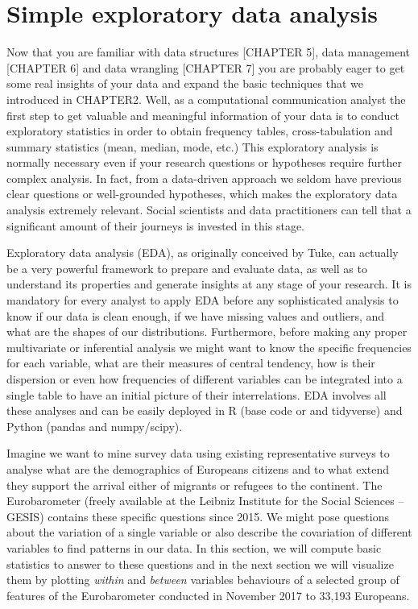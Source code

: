 \section{Simple exploratory data analysis}

Now that you are familiar with data structures [CHAPTER 5], data management [CHAPTER 6] and data wrangling [CHAPTER 7] you are probably eager to get some real insights of your data and expand the basic techniques that we introduced in CHAPTER2. Well, as a computational communication analyst the first step to get valuable and meaningful information of your data is to conduct exploratory statistics in order to obtain frequency tables, cross-tabulation and summary statistics (mean, median, mode, etc.)  This exploratory analysis is normally necessary even if your research questions or hypotheses require further complex analysis. In fact, from a data-driven approach we seldom have previous clear questions or well-grounded hypotheses, which makes the exploratory data analysis extremely relevant. Social scientists and data practitioners can tell that a significant amount of their journeys is invested in this stage.

Exploratory data analysis (EDA), as originally conceived by Tuke\cite{tukey1977exploratory}, can actually be a very powerful framework to prepare and evaluate data, as well as to understand its properties and generate insights at any stage of your research.  It is mandatory for every analyst to apply EDA before any sophisticated analysis to know if our data is clean enough, if we have missing values and outliers, and what are the shapes of our distributions. Furthermore, before making any proper multivariate or inferential analysis we might want to know the specific frequencies for each variable, what are their measures of central tendency, how is their dispersion or even how frequencies of different variables can be integrated into a single table to have an initial picture of their interrelations. EDA involves all these analyses and can be easily deployed in R (base code or and tidyverse) and Python (pandas and numpy/scipy).

Imagine we want to mine survey data using existing representative surveys to analyse what are the demographics of Europeans citizens and to what extend they support the arrival either of migrants or refugees to the continent. The Eurobarometer (freely available at the Leibniz Institute for the Social Sciences – GESIS) contains these specific questions since 2015. We might pose questions about the variation of a single variable or also describe the covariation of different variables to find patterns in our data. In this section, we will compute basic statistics to answer to these questions and in the next section we will visualize them by plotting \textit{within} and \textit{between} variables behaviours of a selected group of features of the Eurobarometer conducted in November 2017 to 33,193 Europeans. 


